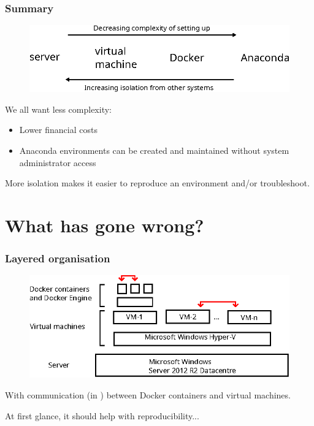 \documentclass[11pt,aspectratio=43,ignorenonframetext,t]{beamer}
\begin{document}
\begin{frame}

\frametitle{Summary}

\begin{figure}
  \centering
  \includegraphics[width=\textwidth]{inkscape/summary}
\end{figure}

We all want less complexity:
\begin{itemize}
  \item Lower financial costs
  \item Anaconda environments can be created and maintained without system administrator access
\end{itemize}
\vs

More isolation makes it easier to reproduce an environment and/or troubleshoot.

\end{frame}


\section{What has gone wrong?}


\begin{frame}

\frametitle{Layered organisation}

\begin{figure}
  \centering
  \includegraphics[width=\textwidth]{inkscape/layers}
\end{figure}

With communication (in {}) between Docker containers and virtual machines.
\vs

At first glance, it should help with reproducibility...

\end{frame}
\end{document}
